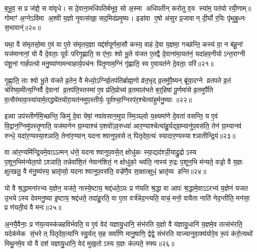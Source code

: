 ब॒भू॒व॒ स प्र ज॑ज्ञे॒ स वा॑वृधे। स दे॒वाना॒मधि॑पतिर्बभूव॒ सो अ॒स्मा अधि॑पतीन् करोतु व॒य स्या॑म॒ पत॑यो रयी॒णाम्॥ गोमाꣳ॑ अ॒ग्नेऽवि॑मा अ॒श्वी य॒ज्ञो नृ॒वत्स॑खा॒ सद॒मिद॑प्रमृ॒ष्यः। इडा॑वा ए॒षो अ॑सुर प्र॒जावान् दी॒र्घो र॒यिः पृ॑थुबु॒ध्नः स॒भावान्॑॥२०॥

{\anuvakamend[{द्वि॒ष्मः सु॒वीर्य॒ꣳ॒ स आ पञ्च॑त्रिशच्च॥६॥}]}

यथा॒ वै स॑मृतसो॒मा ए॒वं वा ए॒ते स॑मृतय॒ज्ञा यद्द॑र्\mbox{}शपूर्णमा॒सौ कस्य॒ वाह॑ दे॒वा य॒ज्ञमा॒ गच्छ॑न्ति॒ कस्य॑ वा॒ न ब॑हू॒नां यज॑मानानां॒ यो वै दे॒वताः॒ पूर्वः॑ परिगृ॒ह्णाति॒ स ए॑नाः॒ श्वो भू॒ते य॑जत ए॒तद्वै दे॒वाना॑मा॒यत॑नं॒ यदा॑हव॒नीयोऽन्त॒राग्नी प॑शू॒नां गार्\mbox{}ह॑पत्यो मनु॒ष्या॑णामन्वाहार्य॒पच॑नः पितृ॒णाम॒ग्निं गृ॑ह्णाति॒ स्व ए॒वायत॑ने दे॒वताः॒ परि॑॥२१॥

गृ॒ह्णा॒ति॒ ताः श्वो भू॒ते य॑जते व्र॒तेन॒ वै मेध्यो॒ऽग्निर्व्र॒तप॑तिर्ब्राह्म॒णो व्र॑त॒भृद् व्र॒तमु॑पै॒ष्यन् ब्रू॑या॒दग्ने व्रतपते व्र॒तं च॑रिष्या॒मीत्य॒ग्निर्वै दे॒वानां व्र॒तप॑ति॒स्तस्मा॑ ए॒व प्र॑ति॒प्रोच्य॑ व्र॒तमाल॑भते ब॒र्॒\mbox{}हिषा॑ पू॒र्णमा॑से व्र॒तमुपै॑ति व॒त्सैर॑मावा॒स्या॑यामे॒तद्ध्ये॑तयो॑रा॒यत॑नमुप॒स्तीर्यः॒ पूर्व॑श्चा॒ग्निरप॑र॒श्चेत्या॑हुर्मनु॒ष्याः॥२२॥

इन्न्वा उप॑स्तीर्णमि॒च्छन्ति॒ किमु॑ दे॒वा येषां॒ नवा॑वसान॒मुपास्मि॒ञ्छ्वो य॒क्ष्यमा॑णे दे॒वता॑ वसन्ति॒ य ए॒वं वि॒द्वान॒ग्निमु॑पस्तृ॒णाति॒ यज॑मानेन ग्रा॒म्याश्च॑ प॒शवो॑ऽव॒रुध्या॑ आर॒ण्याश्चेत्या॑हु॒र्यद्ग्रा॒म्यानु॑प॒वस॑ति॒ तेन॑ ग्रा॒म्यानव॑ रुन्धे॒ यदा॑र॒ण्यस्या॒श्ञाति॒ तेना॑र॒ण्यान् यदनाश्वानुप॒वसेत् पितृदेव॒त्यः॑ स्यादार॒ण्यस्याश्ञातीन्द्रि॒यं॥२३॥

वा आ॑र॒ण्यमि॑न्द्रि॒यमे॒वाऽऽत्मन् ध॑त्ते॒ यदनाश्वानुप॒वसे॒त् क्षोधु॑कः स्या॒द्यद॑श्ञी॒याद्रु॒द्रोऽस्य प॒शून॒भिम॑न्येता॒पोऽश्ञाति॒ तन्नेवा॑शि॒तं नेवान॑शितं॒ न क्षोधु॑को॒ भव॑ति॒ नास्य॑ रु॒द्रः प॒शून॒भि म॑न्यते॒ वज्रो॒ वै य॒ज्ञः क्षुत्खलु॒ वै म॑नु॒ष्य॑स्य॒ भ्रातृ॑व्यो॒ यदनाश्वानुप॒वस॑ति॒ वज्रे॑णै॒व सा॒क्षात्क्षुधं॒ भ्रातृ॑व्य हन्ति॥२४॥

{\anuvakamend[{परि॑ मनु॒ष्या॑ इन्द्रि॒य सा॒क्षात् त्रीणि॑ च॥७॥}]}

यो वै श्र॒द्धामना॑रभ्य य॒ज्ञेन॒ यज॑ते॒ नास्ये॒ष्टाय॒ श्रद्द॑धते॒ऽपः प्र ण॑यति श्र॒द्धा वा आपः॑ श्र॒द्धामे॒वाऽऽरभ्य॑ य॒ज्ञेन॑ यजत उ॒भयेऽस्य देवमनु॒ष्या इ॒ष्टाय॒ श्रद्द॑धते॒ तदा॑हु॒रति॒ वा ए॒ता वर्त्र॑न्नेद॒न्त्यति॒ वाचं॒ मनो॒ वावैता नाति॑ नेद॒न्तीति॒ मन॑सा॒ प्र ण॑यती॒यं वै मनः॑॥२५॥

अ॒नयै॒वैनाः॒ प्र ण॑य॒त्यस्क॑न्नहविर्भवति॒ य ए॒वं वेद॑ यज्ञायु॒धानि॒ संभ॑रति य॒ज्ञो वै य॑ज्ञायु॒धानि॑ य॒ज्ञमे॒व तत्संभ॑रति॒ यदेक॑मेक सं॒भरेत् पितृदेव॒त्या॑नि स्यु॒र्यत् स॒ह सर्वा॑णि मानु॒षाणि॒ द्वेद्वे॒ संभ॑रति याज्यानुवा॒क्य॑योरे॒व रू॒पं क॑रो॒त्यथो॑ मिथु॒नमे॒व यो वै दश॑ यज्ञायु॒धानि॒ वेद॑ मुख॒तोऽस्य य॒ज्ञः क॑ल्पते॒ स्फ्यः॥२६॥


